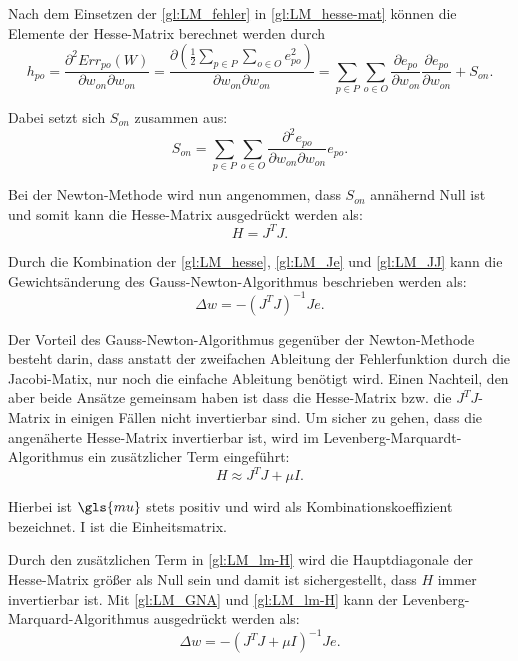 Nach dem Einsetzen der \autoref{gl:LM_fehler} in \autoref{gl:LM_hesse-mat} können die Elemente der Hesse-Matrix berechnet werden durch
\begin{equation}
h_{po} = \frac{\partial^2 Err_{po}(W)}{\partial w_{on} \partial w_{on}} = \frac{\partial \left (\frac{1}{2} \sum_{p \in P} \sum_{o \in O} e_{po}^2 \right )}{\partial w_{on} \partial w_{on}} 
=
\sum_{p \in P} \sum_{o \in O} \frac{\partial e_{po}}{\partial w_{on}} \frac{\partial e_{po}}{\partial w_{on}} + S_{on}.
\label{gl:LM-h}
\end{equation}

Dabei setzt sich $S_{on}$ zusammen aus:
\begin{equation}
S_{on} = \sum_{p \in P} \sum_{o \in O} \frac{\partial^2 e_{po}}{\partial w_{on} \partial w_{on}} e_{po}.
\label{gl:LM_S}
\end{equation}

Bei der Newton-Methode wird nun angenommen, dass $S_{on}$ annähernd Null ist\, und somit kann die Hesse-Matrix ausgedrückt werden als:
\begin{equation}
H = J^T J.
\label{gl:LM_JJ}
\end{equation}

Durch die Kombination der \autoref{gl:LM_hesse}, \autoref{gl:LM_Je} und \autoref{gl:LM_JJ} kann die Gewichtsänderung des Gauss-Newton-Algorithmus beschrieben werden als:
\begin{equation}
\Delta w =-(J^T J)^{-1} J e.
\label{gl:LM_GNA}
\end{equation}

Der Vorteil des Gauss-Newton-Algorithmus gegenüber der Newton-Methode besteht darin, dass anstatt der zweifachen Ableitung der Fehlerfunktion durch die Jacobi-Matix, nur noch die einfache Ableitung benötigt wird. Einen Nachteil, den aber beide Ansätze gemeinsam haben ist dass die Hesse-Matrix bzw. die $J^T J$-Matrix in einigen Fällen nicht invertierbar sind. Um sicher zu gehen, dass die angenäherte Hesse-Matrix invertierbar ist, wird im Levenberg-Marquardt-Algorithmus ein zusätzlicher Term eingeführt:
\begin{equation}
H \approx J^T J + \mu I.
\label{gl:LM_lm-H}
\end{equation}

Hierbei ist $\gls{mu}$ stets positiv und wird als Kombinationskoeffizient bezeichnet. I ist die Einheitsmatrix.

Durch den zusätzlichen Term in \autoref{gl:LM_lm-H} wird die Hauptdiagonale der Hesse-Matrix größer als Null sein und damit ist sichergestellt, dass $H$ immer invertierbar ist. Mit \autoref{gl:LM_GNA} und \autoref{gl:LM_lm-H} kann der Levenberg-Marquard-Algorithmus ausgedrückt werden als:
\begin{equation}
\Delta w =-(J^T J + \mu I)^{-1} J e.
\label{gl:LM_lm-delta-w}
\end{equation}

